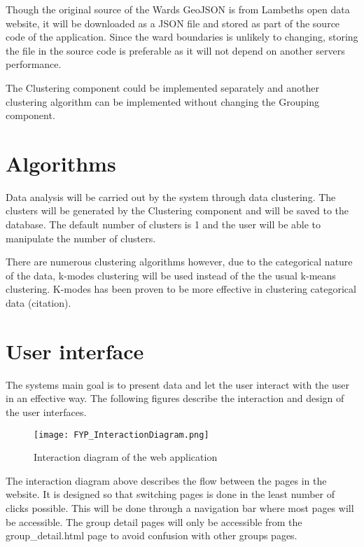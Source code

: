 Though the original source of the Wards GeoJSON is from Lambeth\textquotesingle s open data website, it will be downloaded as a JSON file and stored as part of the source code of the application. Since the ward boundaries is unlikely to changing, storing the file in the source code is preferable as it will not depend on another server\textquotesingle s performance.\par

The Clustering component could be implemented separately and another clustering algorithm can be implemented without changing the Grouping component. 



\section{Algorithms}
Data analysis will be carried out by the system through data clustering. The clusters will be generated by the Clustering component and will be saved to the database. The default number of clusters is 1 and the user will be able to manipulate the number of clusters. \par

There are numerous clustering algorithms however, due to the categorical nature of the data, k-modes clustering will be used instead of the the usual k-means clustering. K-modes has been proven to be more effective in clustering categorical data (citation).

\section{User interface} \label{interface}
The system\textquotesingle s main goal is to present data and let the user interact with the user in an effective way. The following figures describe the interaction and design of the user interfaces.

\begin{figure}[h]
\centering
\texttt{[image: FYP\_InteractionDiagram.png]}
\caption{Interaction diagram of the web application}
\end{figure}

The interaction diagram above describes the flow between the pages in the website. It is designed so that switching pages is done in the least number of clicks possible. This will be done through a navigation bar where most pages will be accessible. The group detail pages will only be accessible from the group\_detail.html page to avoid confusion with other groups\textsc{} pages.\par


